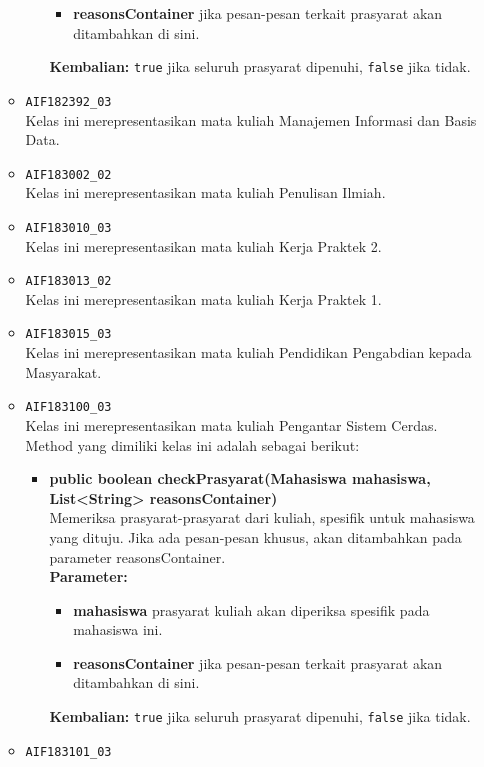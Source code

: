 \begin{enumerate}
\begin{itemize}
\begin{itemize}
\begin{itemize}
				\item \textbf{reasonsContainer} jika pesan-pesan terkait prasyarat akan ditambahkan di sini.
			\end{itemize}
			\textbf{Kembalian:} \texttt{true} jika seluruh prasyarat dipenuhi, \texttt{false} jika tidak.
		\end{itemize}
		\item \texttt{AIF182392\_03} \\
		Kelas ini merepresentasikan mata kuliah Manajemen Informasi dan Basis Data.
		\item \texttt{AIF183002\_02} \\
		Kelas ini merepresentasikan mata kuliah Penulisan Ilmiah.
		\item \texttt{AIF183010\_03} \\
		Kelas ini merepresentasikan mata kuliah Kerja Praktek 2.
		\item \texttt{AIF183013\_02} \\
		Kelas ini merepresentasikan mata kuliah Kerja Praktek 1.
		\item \texttt{AIF183015\_03} \\
		Kelas ini merepresentasikan mata kuliah Pendidikan Pengabdian kepada Masyarakat.
		\item \texttt{AIF183100\_03} \\
		Kelas ini merepresentasikan mata kuliah Pengantar Sistem Cerdas. Method yang dimiliki kelas ini adalah sebagai berikut: 
		\begin{itemize}
			\item \textbf{public boolean checkPrasyarat(Mahasiswa mahasiswa, List<String> reasonsContainer)}\\
			Memeriksa prasyarat-prasyarat dari kuliah, spesifik untuk mahasiswa yang dituju. Jika ada pesan-pesan khusus, akan ditambahkan pada parameter reasonsContainer.\\
			\textbf{Parameter:}
			\begin{itemize}
				\item \textbf{mahasiswa} prasyarat kuliah akan diperiksa spesifik pada mahasiswa ini.
				\item \textbf{reasonsContainer} jika pesan-pesan terkait prasyarat akan ditambahkan di sini.
			\end{itemize}
			\textbf{Kembalian:} \texttt{true} jika seluruh prasyarat dipenuhi, \texttt{false} jika tidak.
		\end{itemize}
		\item \texttt{AIF183101\_03} \\

\end{itemize}
\end{enumerate}
